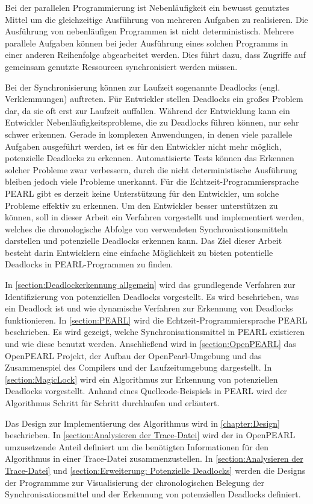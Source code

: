 Bei der parallelen Programmierung ist Nebenläufigkeit ein bewusst genutztes
Mittel um die gleichzeitige Ausführung von mehreren Aufgaben zu realisieren. Die
Ausführung von nebenläufigen Programmen ist nicht deterministisch. Mehrere
parallele Aufgaben können bei jeder Ausführung eines solchen Programms in einer
anderen Reihenfolge abgearbeitet werden. Dies führt dazu, dass Zugriffe auf
gemeinsam genutzte Ressourcen synchronisiert werden müssen.

Bei der Synchronisierung können zur Laufzeit sogenannte Deadlocks (engl.
Verklemmungen) auftreten. Für Entwickler stellen Deadlocks ein großes Problem
dar, da sie oft erst zur Laufzeit auffallen. Während der Entwicklung kann ein
Entwickler Nebenläufigkeitsprobleme, die zu Deadlocks führen können, nur sehr
schwer erkennen. Gerade in komplexen Anwendungen, in denen viele parallele
Aufgaben ausgeführt werden, ist es für den Entwickler nicht mehr möglich,
potenzielle Deadlocks zu erkennen. Automatisierte Tests können das Erkennen
solcher Probleme zwar verbessern, durch die nicht deterministische Ausführung
bleiben jedoch viele Probleme unerkannt. Für die Echtzeit-Programmiersprache
PEARL gibt es derzeit keine Unterstützung für den Entwickler, um solche Probleme
effektiv zu erkennen. Um den Entwickler besser unterstützen zu können, soll in
dieser Arbeit ein Verfahren vorgestellt und implementiert werden, welches die
chronologische Abfolge von verwendeten Synchronisationsmitteln darstellen und
potenzielle Deadlocks erkennen kann. Das Ziel dieser Arbeit besteht darin
Entwicklern eine einfache Möglichkeit zu bieten potentielle Deadlocks in
PEARL-Programmen zu finden.

In \cref{section:Deadlockerkennung allgemein} wird das grundlegende Verfahren
zur Identifizierung von potenziellen Deadlocks vorgestellt. Es wird beschrieben,
was ein Deadlock ist und wie dynamische Verfahren zur Erkennung von Deadlocks
funktionieren. In \cref{section:PEARL} wird die Echtzeit-Programmiersprache
PEARL beschrieben. Es wird gezeigt, welche Synchronisationsmittel in PEARL
existieren und wie diese benutzt werden. Anschließend wird in
\cref{section:OpenPEARL} das OpenPEARL Projekt, der Aufbau der
OpenPearl-Umgebung und das Zusammenspiel des Compilers und der Laufzeitumgebung
dargestellt. In \cref{section:MagicLock} wird ein Algorithmus zur Erkennung von
potenziellen Deadlocks vorgestellt. Anhand eines Quellcode-Beispiels in PEARL
wird der Algorithmus Schritt für Schritt durchlaufen und erläutert. 

Das Design zur Implementierung des Algorithmus wird in \cref{chapter:Design}
beschrieben. In \cref{section:Analysieren der Trace-Datei} wird der in OpenPEARL
umzusetzende Anteil definiert um die benötigten Informationen für den
Algorithmus in einer Trace-Datei zusammenzustellen. In \cref{section:Analysieren
der Trace-Datei} und \cref{section:Erweiterung: Potenzielle Deadlocks} werden
die Designs der Programmme zur Visualisierung der chronologischen Belegung der
Synchronisationsmittel und der Erkennung von potenziellen Deadlocks definiert.

